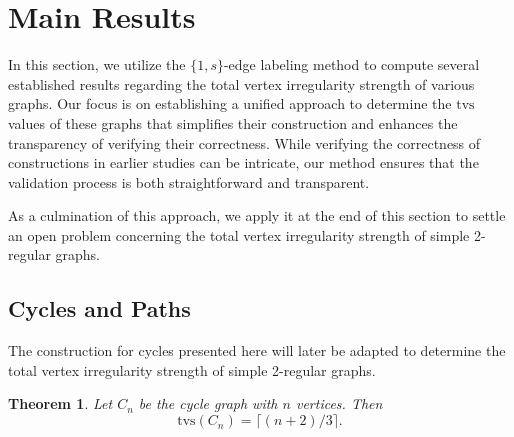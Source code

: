 \documentclass[11pt]{article}
\newtheorem{thm}{Theorem}[section]
\numberwithin{equation}{section}
\begin{document}
\section{Main Results}
In this section, we utilize the \(\{1,s\}\)-edge labeling method to compute several established results regarding the total vertex irregularity strength of various graphs. Our focus is on establishing a unified approach to determine the \(\mathrm{tvs}\) values of these graphs that simplifies their construction and enhances the transparency of verifying their correctness. While verifying the correctness of constructions in earlier studies can be intricate, our method ensures that the validation process is both straightforward and transparent.

As a culmination of this approach, we apply it at the end of this section to settle an open problem concerning the total vertex irregularity strength of simple 2-regular graphs.

\subsection{Cycles and Paths}

The construction for cycles presented here will later be adapted to determine the total vertex irregularity strength of simple 2-regular graphs.

\begin{thm}\label{cycle}
Let \(C_n\) be the cycle graph with \(n\) vertices. Then
\[
\mathrm{tvs}(C_n) = \lceil (n+2)/3 \rceil.
\]
\end{thm}
\end{document}
